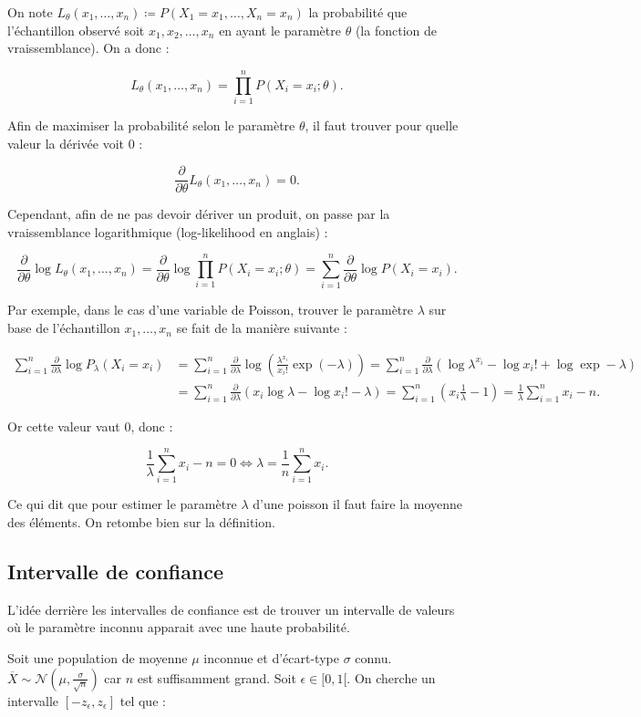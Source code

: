 \documentclass{article}
\renewcommand{\pd}[1]{\frac {\partial}{\partial #1}}
\begin{document}
		On note $L_\theta(x_1, \ldots, x_n) \coloneqq P(X_1=x_1, \ldots, X_n=x_n)$ la probabilité que l'échantillon observé soit $x_1, x_2, \ldots, x_n$ en ayant le paramètre $\theta$
		(la fonction de vraissemblance). On a donc :

		\[L_\theta(x_1, \ldots, x_n) = \prod_{i=1}^nP(X_i=x_i ; \theta).\]

		Afin de maximiser la probabilité selon le paramètre $\theta$, il faut trouver pour quelle valeur la dérivée voit 0 :

		\[\pd \theta L_\theta(x_1, \ldots, x_n) = 0.\]

		Cependant, afin de ne pas devoir dériver un produit, on passe par la vraissemblance logarithmique (log-likelihood en anglais) :

		\[\pd \theta \log L_\theta(x_1, \ldots, x_n) = \pd \theta \log \prod_{i=1}^n P(X_i=x_i ; \theta) = \sum_{i=1}^n \pd \theta \log P(X_i=x_i).\]

		Par exemple, dans le cas d'une variable de Poisson, trouver le paramètre $\lambda$ sur base de l'échantillon $x_1, \ldots, x_n$ se fait de la manière suivante :

		\begin{align*}
			\sum_{i=1}^n\pd \lambda \log P_\lambda(X_i=x_i) &= \sum_{i=1}^n \pd \lambda \log\left(\frac {\lambda^{x_i}}{x_i!}\exp(-\lambda)\right)
			= \sum_{i=1}^n\pd \lambda \left(\log\lambda^{x_i} - \log x_i! + \log\exp-\lambda\right) \\
			&= \sum_{i=1}^n\pd\lambda\left(x_i\log\lambda - \log x_i! - \lambda\right) = \sum_{i=1}^n\left(x_i\frac 1\lambda - 1\right) = \frac 1\lambda\sum_{i=1}^nx_i - n.
		\end{align*}

		Or cette valeur vaut 0, donc :

		\[\frac 1\lambda\sum_{i=1}^nx_i - n = 0 \iff \lambda = \frac 1n\sum_{i=1}^nx_i.\]

		Ce qui dit que pour estimer le paramètre $\lambda$ d'une poisson il faut faire la moyenne des éléments. On retombe bien sur la définition.

	\subsection{Intervalle de confiance}
		L'idée derrière les intervalles de confiance est de trouver un intervalle de valeurs où le paramètre inconnu apparait avec une haute probabilité.

		Soit une population de moyenne $\mu$ inconnue et d'écart-type $\sigma$ connu. $\overline X \sim \mathcal N(\mu, \frac \sigma{\sqrt n})$ car $n$ est suffisamment grand.
		Soit $\epsilon \in [0, 1[$. On cherche un intervalle $[-z_\epsilon, z_\epsilon]$ tel que :
\end{document}
